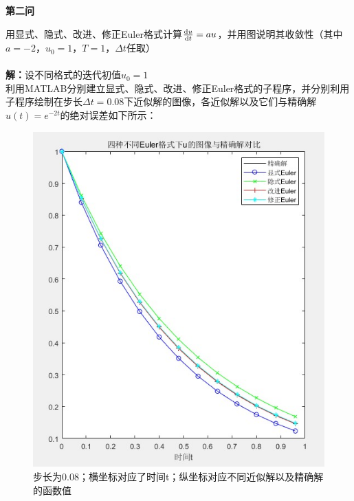 \documentclass[12pt]{article}
\begin{document}
\begin{center}
	\textbf{第二问}
\end{center}
用显式、隐式、改进、修正Euler格式计算$\frac{{\rm d}u}{{\rm d}t}=au$，并用图说明其收敛性（其中$a=-2$，$u_0=1$，$T=1$，$\Delta{t}$任取）\\
\\
\noindent \textbf{解：}设不同格式的迭代初值$u_0=1$
\\利用MATLAB分别建立显式、隐式、改进、修正Euler格式的子程序，并分别利用子程序绘制在步长$\Delta{t}=0.08$下近似解的图像，各近似解以及它们与精确解$u(t)=e^{-2t}$的绝对误差如下所示：
\begin{figure}[H]
	\centering
	\includegraphics[width=1\textwidth]{1}
	\caption{步长为0.08；横坐标对应了时间t；纵坐标对应不同近似解以及精确解的函数值}
\end{figure}
\end{document}
